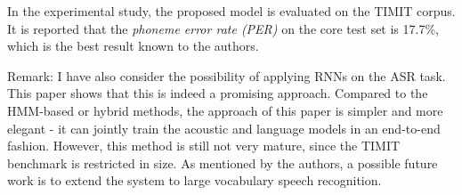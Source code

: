 In the experimental study, the proposed model is evaluated on the TIMIT corpus. It is reported that the \emph{phoneme error rate (PER)} on the core test set is 17.7\%, which is the best result known to the authors.

Remark: I have also consider the possibility of applying RNNs on the ASR task. This paper shows that this is indeed a promising approach. Compared to the HMM-based or hybrid methods, the approach of this paper is simpler and more elegant - it can jointly train the acoustic and language models in an end-to-end fashion. However, this method is still not very mature, since the TIMIT benchmark is restricted in size. As mentioned by the authors, a possible future work is to extend the system to large vocabulary speech recognition. 